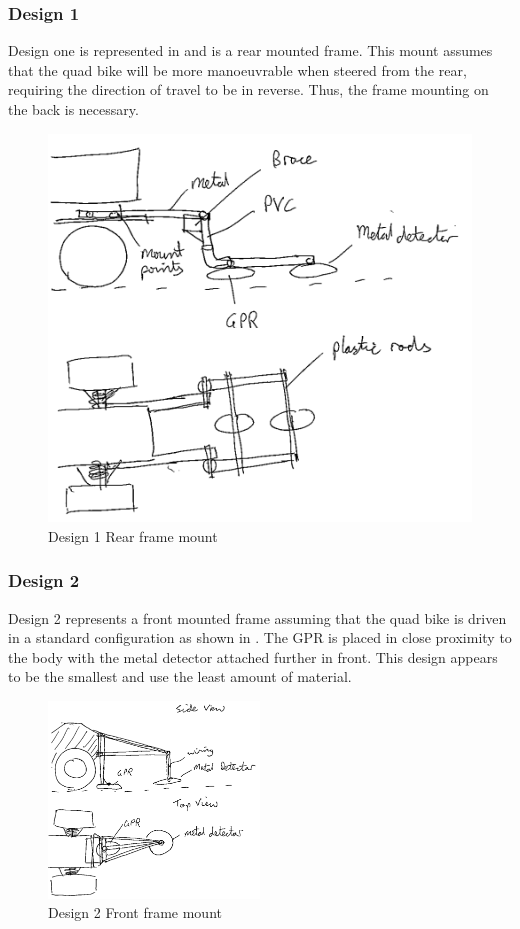 \documentclass[main.tex]{subfiles}
\begin{document}
\subsubsection{Design 1}
Design one is represented in  and is a rear mounted frame. This mount assumes that the quad bike will be more manoeuvrable when steered from the rear, requiring the direction of travel to be in reverse. Thus, the frame mounting on the back is necessary. 
 \begin{figure}[ht]
 \includegraphics[width=.5\textwidth]{4-ConceptDesign/Rear_Mount.png}
 \centering
 \caption{Design 1 Rear frame mount}
 \end{figure}

\subsubsection{Design 2}
Design 2 represents a front mounted frame assuming that the quad bike is driven in a standard configuration as shown in . The GPR is placed in close proximity to the body with the metal detector attached further in front. This design appears to be the smallest and use the least amount of material.
\begin{figure}[ht]
\includegraphics[width=0.5\textwidth]{4-ConceptDesign/front_frame_design_triangle.png}
\centering
\caption{Design 2 Front frame mount}
\end{figure}
\end{document}

